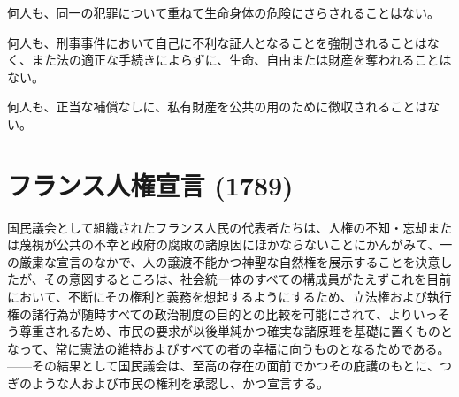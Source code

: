 何人も、同一の犯罪について重ねて生命身体の危険にさらされることはない。

何人も、刑事事件において自己に不利な証人となることを強制されることはなく、また法の適正な手続きによらずに、生命、自由または財産を奪われることはない。

何人も、正当な補償なしに、私有財産を公共の用のために徴収されることはない。


\section{フランス人権宣言 (1789)}
\label{french}
 
国民議会として組織されたフランス人民の代表者たちは、人権の不知・忘却または蔑視が公共の不幸と政府の腐敗の諸原因にほかならないことにかんがみて、一の厳粛な宣言のなかで、人の譲渡不能かつ神聖な自然権を展示することを決意したが、その意図するところは、社会統一体のすべての構成員がたえずこれを目前において、不断にその権利と義務を想起するようにするため、立法権および執行権の諸行為が随時すべての政治制度の目的との比較を可能にされて、よりいっそう尊重されるため、市民の要求が以後単純かつ確実な諸原理を基礎に置くものとなって、常に憲法の維持およびすべての者の幸福に向うものとなるためである。——その結果として国民議会は、至高の存在の面前でかつその庇護のもとに、つぎのような人および市民の権利を承認し、かつ宣言する。

